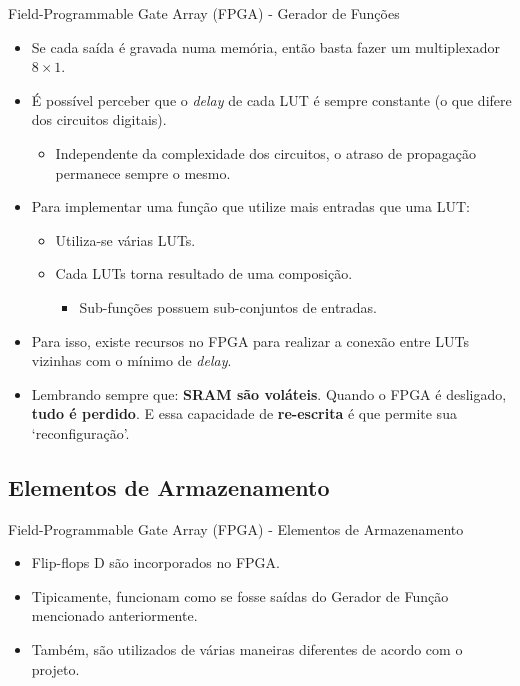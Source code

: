 \documentclass[aspectratio=169]{beamer}
\begin{document}
	\begin{frame}{Field-Programmable Gate Array (FPGA) - Gerador de Funções}
		\begin{itemize}
			\setlength\itemsep{0.5em}
			\item Se cada saída é gravada numa memória, então basta fazer um multiplexador $8 \times 1$.
			\item É possível perceber que o \textit{delay} de cada LUT é sempre constante (o que difere dos circuitos digitais).
			\begin{itemize}
				\item Independente da complexidade dos circuitos, o atraso de propagação permanece sempre o mesmo.
			\end{itemize}
			
			\item Para implementar uma função que utilize mais entradas que uma LUT:
			\begin{itemize}
				\item Utiliza-se várias LUTs. 
				\item Cada LUTs torna resultado de uma composição.
				\begin{itemize}
					\item Sub-funções possuem sub-conjuntos de entradas.
				\end{itemize}
			\end{itemize}
		
			\item Para isso, existe recursos no FPGA para realizar a conexão entre LUTs vizinhas com o mínimo de \textit{delay}.
			
			\item Lembrando sempre que: \textbf{SRAM são voláteis}. Quando o FPGA é desligado, \textbf{tudo é perdido}. E essa capacidade de \textbf{re-escrita} é que permite sua `reconfiguração'.
		\end{itemize}
	\end{frame}
	
	\subsection{Elementos de Armazenamento}
	\begin{frame}{Field-Programmable Gate Array (FPGA) - Elementos de Armazenamento}
		\begin{itemize}
			\setlength\itemsep{1.5em}
			\item Flip-flops D são incorporados no FPGA.
			\item Tipicamente, funcionam como se fosse saídas do Gerador de Função mencionado anteriormente.
			
			\item Também, são utilizados de várias maneiras diferentes de acordo com o projeto. 
		\end{itemize}
	\end{frame}
	
\end{document}
